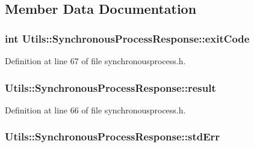 \subsection{\-Member \-Data \-Documentation}
\hypertarget{struct_utils_1_1_synchronous_process_response_addc9fc8217e8275e96b9426afc976a21}{
\subsubsection[{exit\-Code}]{\setlength{\rightskip}{0pt plus 5cm}int {\bf \-Utils\-::\-Synchronous\-Process\-Response\-::exit\-Code}}}\label{struct_utils_1_1_synchronous_process_response_addc9fc8217e8275e96b9426afc976a21}


\-Definition at line 67 of file synchronousprocess.\-h.

\hypertarget{struct_utils_1_1_synchronous_process_response_a292da97b1219d5bf29bdcc96ddeaee91}{
\subsubsection[{result}]{ {\bf \-Utils\-::\-Synchronous\-Process\-Response\-::result}}}\label{struct_utils_1_1_synchronous_process_response_a292da97b1219d5bf29bdcc96ddeaee91}


\-Definition at line 66 of file synchronousprocess.\-h.

\hypertarget{struct_utils_1_1_synchronous_process_response_a328fa8fa6a704de6827a005d7e00bd82}{
\subsubsection[{std\-Err}]{ {\bf \-Utils\-::\-Synchronous\-Process\-Response\-::std\-Err}}}\label{struct_utils_1_1_synchronous_process_response_a328fa8fa6a704de6827a005d7e00bd82}



